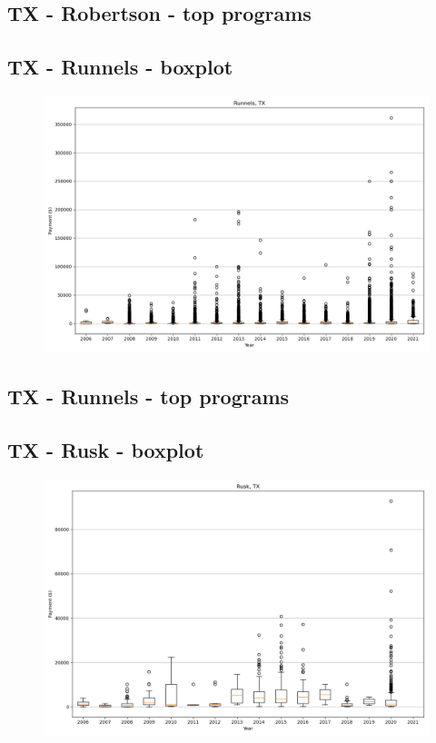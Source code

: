 \subsection*{TX - Robertson - top programs}

\newpage
\subsection*{TX - Runnels - boxplot}
\begin{figure}[h]
\centering
\includegraphics[width=7in]{../output/boxplots/counties/Runnels-TX_boxplot.png}
\end{figure}


\subsection*{TX - Runnels - top programs}

\newpage
\subsection*{TX - Rusk - boxplot}
\begin{figure}[h]
\centering
\includegraphics[width=7in]{../output/boxplots/counties/Rusk-TX_boxplot.png}
\end{figure}


